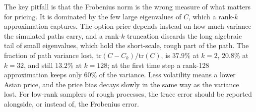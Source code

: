 The key pitfall is that the Frobenius norm is the wrong measure of what matters for
pricing.  It is dominated by the few large eigenvalues of $C$, which a rank-$k$
approximation captures.  The option price depends instead on how much variance the
simulated paths carry, and a rank-$k$ truncation discards the long algebraic tail of
small eigenvalues, which hold the short-scale, rough part of the path.  The fraction
of path variance lost, $\mathrm{tr}(C - C_k)/\mathrm{tr}(C)$, is $37.9\%$ at $k = 2$,
$20.8\%$ at $k = 32$, and still $13.2\%$ at $k = 128$; at the first time step a rank-128
approximation keeps only 60\% of the variance.  Less volatility means a lower Asian
price, and the price bias decays slowly in the same way as the variance lost.  For
low-rank samplers of rough processes, the trace error should be reported alongside,
or instead of, the Frobenius error.
